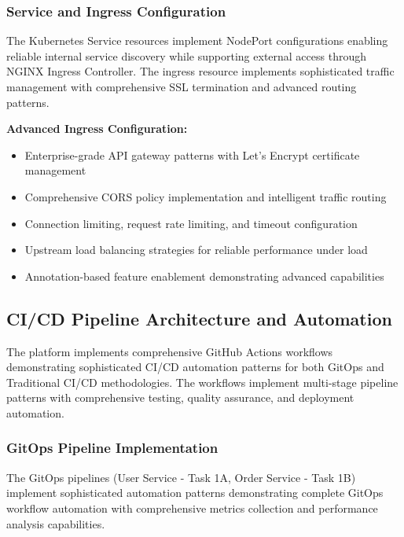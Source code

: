 \subsubsection{Service and Ingress Configuration}

The Kubernetes Service resources implement NodePort configurations enabling reliable internal service discovery while supporting external access through NGINX Ingress Controller. The ingress resource implements sophisticated traffic management with comprehensive SSL termination and advanced routing patterns.

\textbf{Advanced Ingress Configuration:}
\begin{itemize}
\item Enterprise-grade API gateway patterns with Let's Encrypt certificate management
\item Comprehensive CORS policy implementation and intelligent traffic routing
\item Connection limiting, request rate limiting, and timeout configuration
\item Upstream load balancing strategies for reliable performance under load
\item Annotation-based feature enablement demonstrating advanced capabilities
\end{itemize}

\subsection{CI/CD Pipeline Architecture and Automation}

The platform implements comprehensive GitHub Actions workflows demonstrating sophisticated CI/CD automation patterns for both GitOps and Traditional CI/CD methodologies. The workflows implement multi-stage pipeline patterns with comprehensive testing, quality assurance, and deployment automation.

\subsubsection{GitOps Pipeline Implementation}

The GitOps pipelines (User Service - Task 1A, Order Service - Task 1B) implement sophisticated automation patterns demonstrating complete GitOps workflow automation with comprehensive metrics collection and performance analysis capabilities.

